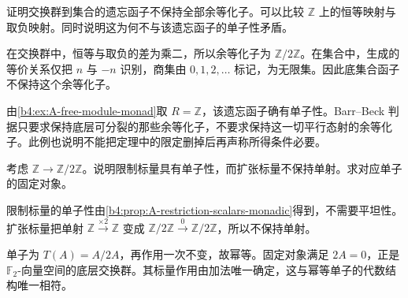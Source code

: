 \begin{exercise}\label{b4:ex:A-abelian-forgetful-coequalizer}
	证明交换群到集合的遗忘函子不保持全部余等化子。可以比较 \(\mathbb Z\) 上的恒等映射与取负映射。同时说明这为何不与该遗忘函子的单子性矛盾。
\end{exercise}
\begin{solution}
	在交换群中，恒等与取负的差为乘二，所以余等化子为 \(\mathbb Z/2\mathbb Z\)。在集合中，生成的等价关系仅把 \(n\) 与 \(-n\) 识别，商集由 \(0,1,2,\ldots\) 标记，为无限集。因此底集合函子不保持这个余等化子。

	由\cref{b4:ex:A-free-module-monad}取 \(R=\mathbb Z\)，该遗忘函子确有单子性。Barr–Beck 判据只要求保持底层可分裂的那些余等化子，不要求保持这一切平行态射的余等化子。此例也说明不能把定理中的限定删掉后再声称所得条件必要。
\end{solution}

\begin{exercise}\label{b4:ex:A-nonflat-monadic}
	考虑 \(\mathbb Z\to\mathbb Z/2\mathbb Z\)。说明限制标量具有单子性，而扩张标量不保持单射。求对应单子的固定对象。
\end{exercise}
\begin{solution}
	限制标量的单子性由\cref{b4:prop:A-restriction-scalars-monadic}得到，不需要平坦性。扩张标量把单射 \(\mathbb Z\xrightarrow{\times2}\mathbb Z\) 变成 \(\mathbb Z/2\mathbb Z\xrightarrow0\mathbb Z/2\mathbb Z\)，所以不保持单射。

	单子为 \(T(A)=A/2A\)，再作用一次不变，故幂等。固定对象满足 \(2A=0\)，正是 \(\mathbb F_2\)-向量空间的底层交换群。其标量作用由加法唯一确定，这与幂等单子的代数结构唯一相符。
\end{solution}

